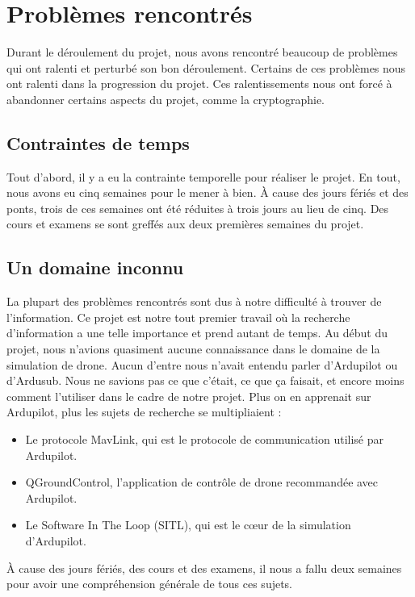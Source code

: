 \documentclass{scrartcl}
\begin{document}
\section{Problèmes rencontrés}
\label{sec:problemes}
Durant le déroulement du projet, nous avons rencontré beaucoup de problèmes qui ont ralenti et perturbé son bon déroulement.
Certains de ces problèmes nous ont ralenti dans la progression du projet.
Ces ralentissements nous ont forcé à abandonner certains aspects du projet, comme la cryptographie.

\subsection{Contraintes de temps}
Tout d'abord, il y a eu la contrainte temporelle pour réaliser le projet.
En tout, nous avons eu cinq semaines pour le mener à bien.
À cause des jours fériés et des ponts, trois de ces semaines ont été réduites à trois jours au lieu de cinq.
Des cours et examens se sont greffés aux deux premières semaines du projet.

\subsection{Un domaine inconnu}
La plupart des problèmes rencontrés sont dus à notre difficulté à trouver de l'information.
Ce projet est notre tout premier travail où la recherche d'information a une telle importance et prend autant de temps.
Au début du projet, nous n'avions quasiment aucune connaissance dans le domaine de la simulation de drone.
Aucun d'entre nous n'avait entendu parler d'Ardupilot ou d'Ardusub.
Nous ne savions pas ce que c'était, ce que ça faisait, et encore moins comment l'utiliser dans le cadre de notre projet.
Plus on en apprenait sur Ardupilot, plus les sujets de recherche se multipliaient :
\begin{itemize}
    \item Le protocole MavLink, qui est le protocole de communication utilisé par Ardupilot.
    \item QGroundControl, l'application de contrôle de drone recommandée avec Ardupilot.
    \item Le Software In The Loop (SITL), qui est le cœur de la simulation d'Ardupilot.
\end{itemize}
À cause des jours fériés, des cours et des examens, il nous a fallu deux semaines pour avoir une compréhension générale de tous ces sujets.
\end{document}
